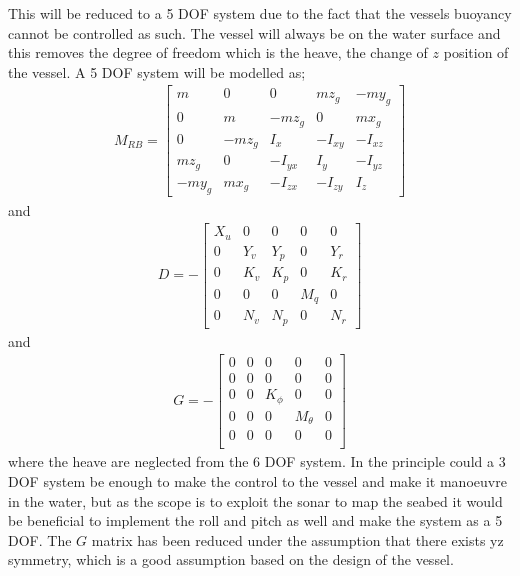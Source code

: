 This will be reduced to a 5 \ac{DOF} system due to the fact that the
vessels buoyancy cannot be controlled as such. The vessel will always
be on the water surface and this removes the degree of freedom which
is the heave, the change of $z$ position of the vessel. A 5 \ac{DOF}
system will be modelled as;
\begin{align}
M_{RB} =
\begin{bmatrix}
m & 0 & 0 & mz_g & -my_g\\
0 & m & -mz_g & 0 & mx_g\\
0 & -mz_g & I_x & -I_{xy} & -I_{xz}\\
mz_g & 0 & -I_{yx} & I_y & -I_{yz}\\
-my_g & mx_g & -I_{zx} & -I_{zy} & I_z
\end{bmatrix}
\end{align}
and
\begin{align}
D = -
\begin{bmatrix}
X_u & 0 & 0 & 0 & 0\\
0 & Y_v & Y_p & 0 & Y_r\\
0 & K_v & K_p & 0 & K_r\\
0 & 0 & 0 & M_q & 0\\
0 & N_v & N_p & 0 & N_r
\end{bmatrix}
\label{eq:damping-matrix}
\end{align}
and
\begin{align}
G = -
\begin{bmatrix}
0 & 0 & 0 & 0 & 0\\
0 & 0 & 0 & 0 & 0\\
0 & 0 & K_\phi & 0 & 0\\
0 & 0 & 0 & M_\theta & 0\\
0 & 0 & 0 & 0 & 0\\
\end{bmatrix}
\label{eq:restoreforce}
\end{align}
where the heave are neglected from the 6 \ac{DOF} system. In the principle could a 3 \ac{DOF} system be enough to make the control to the vessel and make it manoeuvre in the water, but as the scope is to exploit the sonar to map the seabed it would be beneficial to implement the roll and pitch as well and make the system as a 5 \ac{DOF}. The $G$ matrix has been reduced under the assumption that there exists yz symmetry, which is a good assumption based on the design of the vessel.

